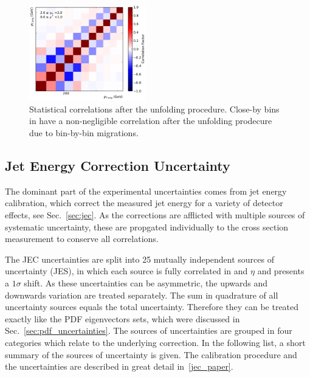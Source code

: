 \begin{figure}[htbp]
    \includegraphics[width=0.45\textwidth]{figures/measurement/unf_nlo_corr_yb2ys0.pdf}
    \caption{Statistical correlations after the unfolding procedure. Close-by bins in \ptavg
    have a non-negligible correlation after the unfolding prodecure due to bin-by-bin migrations.}
    \label{fig:corr_unfolding_nlo}
\end{figure}

\subsection{Jet Energy Correction Uncertainty}

The dominant part of the experimental uncertainties comes from jet energy
calibration, which correct the measured jet energy for a variety of detector
effects, see Sec.~\ref{sec:jec}. As the corrections are afflicted with multiple
sources of systematic uncertainty, these are propgated individually to the cross section
measurement to conserve all correlations.

The JEC uncertainties are split into 25 mutually independent sources of
uncertainty (JES), in which each source is fully correlated in \pt and $\eta$
and presents a $1\sigma$ shift. As these uncertainties can be asymmetric, the
upwards and downwards variation are treated separately. The sum in quadrature of
all uncertainty sources equals the total uncertainty. Therefore they can be
treated exactly like the PDF eigenvectors sets, which were discussed in
Sec.~\ref{sec:pdf_uncertainties}. The sources of uncertainties are grouped in
four categories which relate to the underlying correction. In the following
list, a short summary of the sources of uncertainty is given. The calibration
procedure and the uncertainties are described in great detail
in~\ref{jec_paper}.

